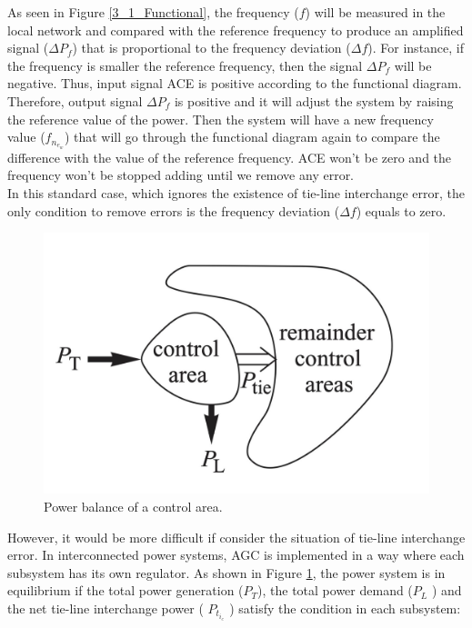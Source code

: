 \documentclass{report}
\begin{document}
As seen in Figure \textcolor{red}{\ref{3_1_Functional}}, the frequency ($f$) will be measured in the local network and compared with the reference frequency to produce an amplified signal ($\Delta P_f$) that is proportional to the frequency deviation ($\Delta f$). For instance, if the frequency is smaller the reference frequency, then the signal $\Delta P_f$ will be negative. Thus, input signal ACE is positive according to the functional diagram. Therefore, output signal $\Delta P_f$ is positive and it will adjust the system by raising the reference value of the power. Then the system will have a new frequency value ($f_n_e_w$) that will go through the functional diagram again to compare the difference with the value of the reference frequency. ACE won’t be zero and the frequency won’t be stopped adding until we remove any error.\\

In this standard case, which ignores the existence of tie-line interchange error, the only condition to remove errors is the frequency deviation ($\Delta f$) equals to zero.\\

\begin{figure}[htbp]
\centering
\includegraphics[width =\textwidth]{figure/3_1_Power.png}
\caption{Power balance of a control area.}
\label{3_1_Power}
\end{figure}

However, it would be more difficult if consider the situation of tie-line interchange error. In interconnected power systems, AGC is implemented in a way where each subsystem has its own regulator. As shown in Figure \textcolor{red}{\ref{3_1_Power}}, the power system is in equilibrium if the total power generation ($P_T$), the total power demand ($P_L$ ) and the net tie-line interchange power ( $P_t_i_e$ ) satisfy the condition in each subsystem:\\
\end{document}
